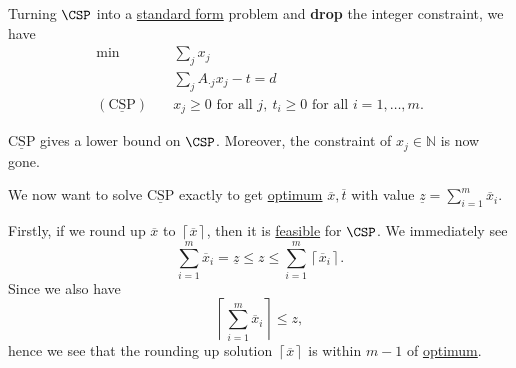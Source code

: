 \begin{answer}
	Turning \(\CSP\) into a \hyperref[def:standard-form]{standard form} problem and \textbf{drop} the integer constraint, we have
	\[
		\begin{aligned}
			\min~                           & \sum\limits_{j} x_{j}                                                        \\
			                                & \sum\limits_{j} A_{\cdot j}x_{j} - t = d                                     \\
			(\mathrm{\underline{CSP}})\quad & x_{j}\geq 0 \text{ for all }j,\ t_{i}\geq 0\text{ for all }i = 1, \dots , m.
		\end{aligned}
	\]

	\begin{note}
		\(\mathrm{\underline{CSP}}\) gives a lower bound on \(\CSP\). Moreover, the constraint of \(x_{j}\in\mathbb{N}\)
		is now gone.
	\end{note}

	We now want to solve \(\mathrm{\underline{CSP}}\) exactly to get \hyperref[def:optimal-solution]{optimum} \(\overline{x}, \overline{t}\) with value \(\underline{z} = \sum\limits_{i=1}^{m} \overline{x}_{i}\).

	Firstly, if we round up \(\overline{x}\) to \(\left\lceil \overline{x} \right\rceil \), then it is \hyperref[def:feasible-solution]{feasible} for \(\CSP\). We immediately see
	\[
		\sum\limits_{i=1}^{m} \overline{x}_{i} = \underline{z} \leq z \leq \sum\limits_{i=1}^{m} \left\lceil \overline{x}_{i} \right\rceil.
	\]
	Since we also have
	\[
		\left\lceil \sum\limits_{i=1}^{m} \overline{x}_{i} \right\rceil \leq z,
	\]
	hence we see that the rounding up solution \(\left\lceil \overline{x} \right\rceil \) is within \(m-1\) of \hyperref[def:optimal-solution]{optimum}.


\end{answer}
